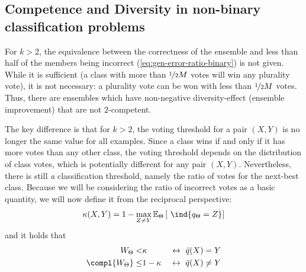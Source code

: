 \documentclass[../main.tex]{subfiles}
\begin{document}
\subsection{Competence and Diversity in non-binary classification problems}
\label{sec:k-competence}
For $k>2$, the equivalence between the correctness of the ensemble and less than half of the members being incorrect (\cf \ref{eq:gen-error-ratio-binary}) is not given. While it is sufficient (a class with more than $\nicefrac{1}{2}M$ votes will win any plurality vote), it is not necessary: a plurality vote can be won with less than $\nicefrac{1}{2}M$ votes. Thus, there are ensembles which have non-negative diversity-effect (ensemble improvement) that are not $2$-competent. %

The key difference is that for $k>2$, the voting threshold for a pair $(X,Y)$ is no longer the same value for all examples. Since a class wins if and only if it has more votes than any other class, the voting threshold depends on the distribution of class votes, which is potentially different for any pair $(X,Y)$. Nevertheless, there is still \textit{a} classification threshold, namely the ratio of votes for the next-best class. Because we will be considering the ratio of incorrect votes as a basic quantity, we will now define it from the reciprocal perspective:
$$
\kappa (X,Y) = 1 - \max_{Z \not= Y} \mathbb{E}_{\Theta}\left[ ~\ind{q_{\Theta} = Z} \right] 
$$
and it holds that
$$
\begin{align}
W_{\Theta} <& \kappa  & ~\leftrightarrow~ \bar{q}(X) = Y \\ 
\compl{W_{\Theta}} \leq& 1-\kappa  & ~\leftrightarrow~ \bar{q}(X) \not= Y
\end{align}
$$
\end{document}
